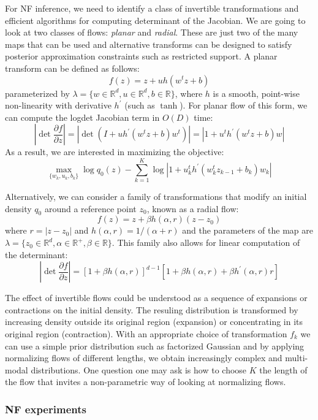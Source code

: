 For NF inference, we need to identify a class of invertible transformations and efficient algorithms for computing determinant of the Jacobian. We are going to look at two classes of flows: \textit{planar} and \textit{radial}. These are just two of the many maps that can be used and alternative transforms can be designed to satisfy posterior approximation constraints such as restricted support. A planar transform can be defined as follows:
\begin{equation}
    f(z) = z + uh(w^{t}z + b)
\end{equation}
parameterized by $\lambda = \{w \in \mathbb{R}^{d}, u \in \mathbb{R}^{d}, b \in \mathbb{R}\}$, where $h$ is a smooth, point-wise non-linearity with derivative $h^{\prime}$ (such as $\tanh$). For planar flow of this form, we can compute the logdet Jacobian term in $O(D)$ time:
\begin{equation}
    |\det \frac{\partial f}{\partial z}| = |\det (I + uh^{\prime}(w^{t}z + b)w^{t})| = |1 + u^{t}h^{\prime}(w^{t}z + b)w|
\end{equation}
As a result, we are interested in maximizing the objective:
\begin{equation}
    \max_{\{w_k,u_k,b_k\}} \log q_0(z) - \sum_{k=1}^{K} \log |1 + u_{k}^{t}h^{\prime}(w_{k}^{t}z_{k-1} + b_k)w_k|
\end{equation}

Alternatively, we can consider a family of transformations that modify an initial density $q_0$ around a reference point $z_0$, known as a radial flow:
\begin{equation}
    f(z) = z + \beta h(\alpha, r)(z-z_0)
\end{equation}
where $r = |z-z_0|$ and $h(\alpha, r) = 1/(\alpha + r)$ and the parameters of the map are $\lambda = \{z_0 \in \mathbb{R}^{d}, \alpha \in \mathbb{R}^{+}, \beta \in \mathbb{R}\}$. This family also allows for linear computation of the determinant:
\begin{equation}
    |\det \frac{\partial f}{\partial z}| = [1+\beta h(\alpha,r)]^{d-1}[1 + \beta h(\alpha,r) + \beta h^{\prime}(\alpha, r)r]
\end{equation}

The effect of invertible flows could be understood as a sequence of expansions or contractions on the initial density. The resuling distribution is transformed by increasing density outside its original region (expansion) or concentrating in its original region (contraction). With an appropriate choice of transformation $f_k$ we can use a simple prior distribution such as factorized Gaussian and by applying normalizing flows of different lengths, we obtain increasingly complex and multi-modal distributions. One question one may ask is how to choose $K$ the length of the flow that invites a non-parametric way of looking at normalizing flows.\\

\subsubsection{NF experiments}










